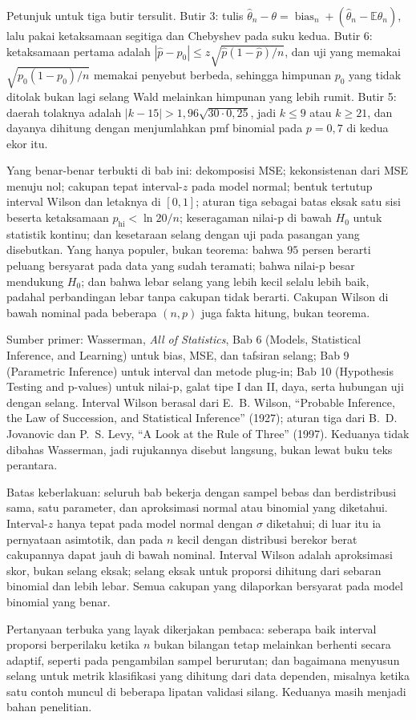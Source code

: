 \begin{latihan}
Petunjuk untuk tiga butir tersulit. Butir 3: tulis
$\hat\theta_n-\theta=\operatorname{bias}_n+(\hat\theta_n-\mathbb{E}\hat\theta_n)$,
lalu pakai ketaksamaan segitiga dan Chebyshev pada suku kedua. Butir 6: ketaksamaan
pertama adalah $|\hat p-p_0|\le z\sqrt{\hat p(1-\hat p)/n}$, dan uji yang memakai
$\sqrt{p_0(1-p_0)/n}$ memakai penyebut berbeda, sehingga himpunan $p_0$ yang tidak
ditolak bukan lagi selang Wald melainkan himpunan yang lebih rumit. Butir 5: daerah
tolaknya adalah $|k-15|>1{,}96\sqrt{30\cdot0{,}25}$, jadi $k\le9$ atau $k\ge21$, dan
dayanya dihitung dengan menjumlahkan pmf binomial pada $p=0{,}7$ di kedua ekor itu.
\end{latihan}

\begin{untukpeneliti}
Yang benar-benar terbukti di bab ini: dekomposisi MSE; kekonsistenan dari MSE menuju
nol; cakupan tepat interval-$z$ pada model normal; bentuk tertutup interval Wilson dan
letaknya di $[0,1]$; aturan tiga sebagai batas eksak satu sisi beserta
ketaksamaan $p_{\mathrm{hi}}<\ln 20/n$; keseragaman nilai-p di bawah $H_0$ untuk
statistik kontinu; dan kesetaraan selang dengan uji pada pasangan yang disebutkan.
Yang hanya populer, bukan teorema: bahwa $95$ persen berarti peluang bersyarat pada
data yang sudah teramati; bahwa nilai-p besar mendukung $H_0$; dan bahwa lebar selang
yang lebih kecil selalu lebih baik, padahal perbandingan lebar tanpa cakupan tidak
berarti. Cakupan Wilson di bawah nominal pada beberapa $(n,p)$ juga fakta hitung, bukan
teorema.

Sumber primer: Wasserman, \emph{All of Statistics}, Bab 6 (Models, Statistical
Inference, and Learning) untuk bias, MSE, dan tafsiran selang; Bab 9 (Parametric
Inference) untuk interval dan metode plug-in; Bab 10 (Hypothesis Testing and p-values)
untuk nilai-p, galat tipe I dan II, daya, serta hubungan uji dengan selang. Interval
Wilson berasal dari E.~B. Wilson, ``Probable Inference, the Law of Succession, and
Statistical Inference'' (1927); aturan tiga dari B.~D. Jovanovic dan P.~S. Levy,
``A Look at the Rule of Three'' (1997). Keduanya tidak dibahas Wasserman, jadi
rujukannya disebut langsung, bukan lewat buku teks perantara.

Batas keberlakuan: seluruh bab bekerja dengan sampel bebas dan berdistribusi sama,
satu parameter, dan aproksimasi normal atau binomial yang diketahui. Interval-$z$
hanya tepat pada model normal dengan $\sigma$ diketahui; di luar itu ia pernyataan
asimtotik, dan pada $n$ kecil dengan distribusi berekor berat cakupannya dapat jauh di
bawah nominal. Interval Wilson adalah aproksimasi skor, bukan selang eksak; selang
eksak untuk proporsi dihitung dari sebaran binomial dan lebih lebar. Semua cakupan yang
dilaporkan bersyarat pada model binomial yang benar.

Pertanyaan terbuka yang layak dikerjakan pembaca: seberapa baik interval proporsi
berperilaku ketika $n$ bukan bilangan tetap melainkan berhenti secara adaptif, seperti
pada pengambilan sampel berurutan; dan bagaimana menyusun selang untuk metrik
klasifikasi yang dihitung dari data dependen, misalnya ketika satu contoh muncul di
beberapa lipatan validasi silang. Keduanya masih menjadi bahan penelitian.
\end{untukpeneliti}

